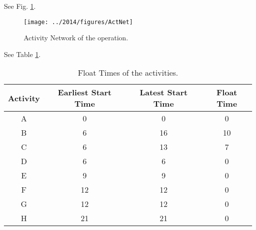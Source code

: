 %
%

\begin{subquestions}


\subquestion

\begin{subsubquestions}
	
\subsubquestion

See Fig. \ref{2014:q2:fig:ActNet}.
\begin{figure}
	\begin{center}
		\texttt{[image: ../2014/figures/ActNet]}
		\caption{\label{2014:q2:fig:ActNet} Activity Network of the operation.}
	\end{center}
\end{figure}


\subsubquestion

 See Table \ref{2014:tab:Act}. 
\begin{table}[ht]
	\centering
	\begin{tabular}{|c|c|c|c|}
		\hline
		Activity&Earliest Start Time&Latest Start Time&Float Time\\
		\hline
		A & 0 & 0 & 0 \\
		B & 6 & 16 & 10 \\
		C & 6 & 13 & 7 \\
		D & 6 & 6 & 0 \\
		E & 9 & 9 & 0 \\
		F & 12 & 12 & 0 \\
		G & 12 & 12 & 0 \\
		H & 21 & 21 & 0  \\
		\hline
		
	\end{tabular}
\caption{\label{2014:tab:Act} Float Times of the activities.}
\end{table}


\end{subsubquestions}
\end{subquestions}
